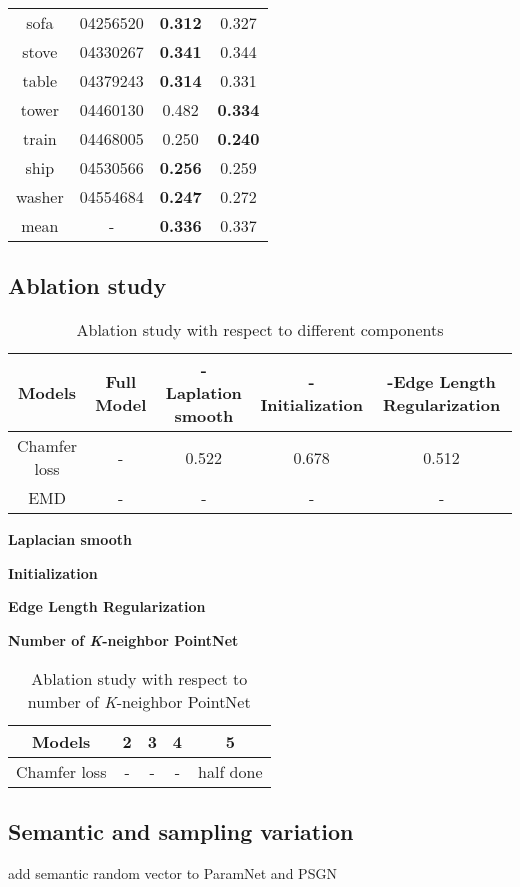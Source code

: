 \begin{table}
\begin{tabular}{c c c c}
		sofa & 04256520 & {\color{blue}\textbf{0.312}} & 0.327\\
		stove & 04330267 & {\color{blue}\textbf{0.341}} & 0.344\\
		table & 04379243 & {\color{blue}\textbf{0.314}} & 0.331\\
		tower & 04460130 & 0.482 & {\color{blue}\textbf{0.334}}\\
		train & 04468005 & 0.250 & {\color{blue}\textbf{0.240}}\\
		ship  & 04530566 & {\color{blue}\textbf{0.256}} & 0.259\\
		washer &  04554684 & {\color{blue}\textbf{0.247}} & 0.272\\
		mean   &     -     & {\color{blue}\textbf{0.336}} & 0.337
	\end{tabular}
\end{table}

\subsection{Ablation study}
\begin{table}
	\caption{Ablation study with respect to different components}
	\label{tab:ablation}
	\centering
	\begin{tabular}{c | c c c c}
		Models &  Full Model  & -Laplation smooth & -Initialization & -Edge Length Regularization \\
		\hline
		Chamfer loss & - & 0.522 & 0.678 & 0.512 \\
		EMD			 & - & -     &   -   &   -
	\end{tabular}
\end{table}
\noindent\textbf{Laplacian smooth}

\noindent\textbf{Initialization}

\noindent\textbf{Edge Length Regularization}

\noindent\textbf{Number of \textit{K}-neighbor PointNet}
\begin{table}
	\caption{Ablation study with respect to number of \textit{K}-neighbor PointNet}
	\label{tab:pointnet}
	\centering
	\begin{tabular}{c | c c c c}
		Models &  2 & 3 & 4 & 5 \\
		\hline
		Chamfer loss & - &  - & - & half done
	\end{tabular}
\end{table}
\subsection{Semantic and sampling variation}
add semantic random vector to ParamNet and PSGN\cite{PSGN}